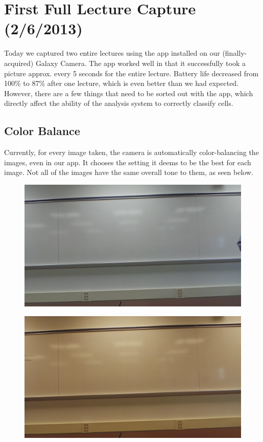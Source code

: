 \documentclass[]{article}
\begin{document}
	\section{First Full Lecture Capture (2/6/2013)}
		Today we captured two entire lectures using the app installed on our (finally-acquired) Galaxy Camera.  The app worked well in that it successfully took a picture approx. every 5 seconds for the entire lecture.  Battery life decreased from 100\% to 87\% after one lecture, which is even better than we had expected.  However, there are a few things that need to be sorted out with the app, which directly affect the ability of the analysis system to correctly classify cells.  
		\subsection*{Color Balance}
		Currently, for every image taken, the camera is automatically color-balancing the images, even in our app.  It chooses the setting it deems to be the best for each image.  Not all of the images have the same overall tone  to them, as seen below.  
\begin{figure}[H]
\centering
\includegraphics[scale=0.1]{images/colorbalance_1}

\end{figure}
		
\begin{figure}[H]
\centering
\includegraphics[scale=0.1]{images/colorbalance_2}

\end{figure}	
		
\end{document}
